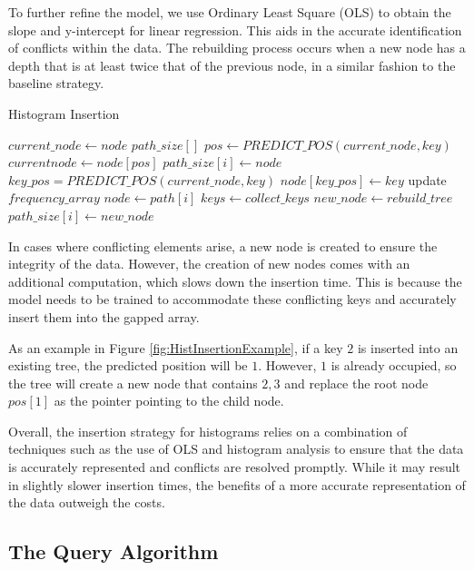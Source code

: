 To further refine the model, we use Ordinary Least Square (OLS) to obtain the slope and y-intercept for linear regression. This aids in the accurate identification of conflicts within the data. The rebuilding process occurs when a new node has a depth that is at least twice that of the previous node, in a similar fashion to the baseline strategy.
\begin{algorithm}
\caption{Histogram Insertion}
\begin{algorithmic}[1]

\State $current\_node \gets node$
\State $path\_size[]$
\State $pos \gets PREDICT\_POS(current\_node, key)$
    \State $current node \gets node[pos]$
    \State $path\_size[i] \gets node$
\Else
    \State $key\_pos = PREDICT\_POS(current\_node, key)$
    \State $node[key\_pos] \gets key$
    \State update $frequency\_array$
\EndIf
\EndWhile
{}
   \State $node \gets path[i]$
        \State $keys \gets collect\_keys$
        \State $new\_node \gets rebuild\_tree$
        \State $path\_size[i] \gets new\_node$
    \EndIf
\EndFor

\EndProcedure
\end{algorithmic}
\end{algorithm}

In cases where conflicting elements arise, a new node is created to ensure the integrity of the data. However, the creation of new nodes comes with an additional computation, which slows down the insertion time. This is because the model needs to be trained to accommodate these conflicting keys and accurately insert them into the gapped array.

As an example in Figure \ref{fig:HistInsertionExample}, if a key $2$ is inserted into an existing tree, the predicted position will be $1$. However, $1$ is already occupied, so the tree will create a new node that contains $2, 3$ and replace the root node $pos[1]$ as the pointer pointing to the child node.

Overall, the insertion strategy for histograms relies on a combination of techniques such as the use of OLS and histogram analysis to ensure that the data is accurately represented and conflicts are resolved promptly. While it may result in slightly slower insertion times, the benefits of a more accurate representation of the data outweigh the costs.

\subsection{The Query Algorithm}

